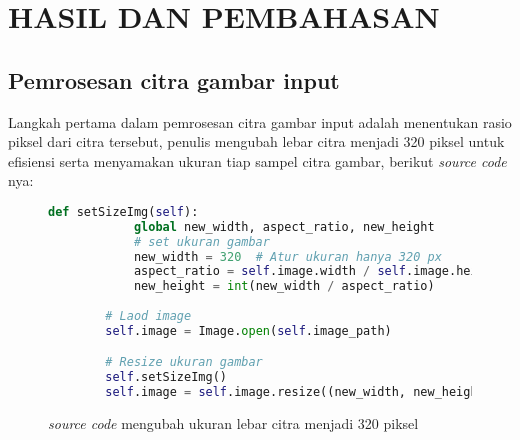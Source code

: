 
\chapter{HASIL DAN PEMBAHASAN}

\section{Pemrosesan citra gambar input}
Langkah pertama dalam pemrosesan citra gambar input adalah menentukan rasio piksel 
dari citra tersebut, penulis mengubah lebar citra menjadi 320 piksel untuk efisiensi 
serta menyamakan ukuran tiap sampel citra gambar, berikut \emph{source code} nya:

\begin{figure}[H]
	\begin{lstlisting}[language=Python, basicstyle=\tiny]
		def setSizeImg(self):
			global new_width, aspect_ratio, new_height
			# set ukuran gambar
			new_width = 320  # Atur ukuran hanya 320 px
			aspect_ratio = self.image.width / self.image.height
			new_height = int(new_width / aspect_ratio)
		
		# Laod image
		self.image = Image.open(self.image_path)

		# Resize ukuran gambar
		self.setSizeImg() 
		self.image = self.image.resize((new_width, new_height)) 
	\end{lstlisting}
	\caption{\emph{source code} mengubah ukuran lebar citra menjadi 320 piksel}
	\label{img:resize_gambar}
\end{figure}

\begin{comment}

\end{comment}